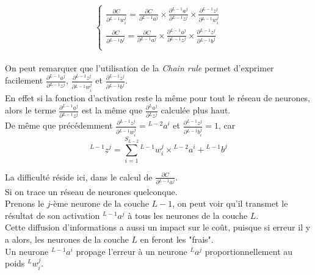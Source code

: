 \documentclass[10pt,a4paper]{report}
\newcommand{\lexp}[1]{\phantom{}^{#1}}
\newcommand{\elem}[4]{\lexp{#2}#1^{#3}_{#4}}
\begin{document}
				$$\left\{
				\begin{array}{l}
					\frac{\partial C}{\partial \elem{w}{L-1}{j}{i}} = \frac{\partial C}{\partial \elem{a}{L-1}{j}{}} \times \frac{\partial \elem{a}{L-1}{j}{}}{\partial \elem{z}{L-1}{j}{}} \times \frac{\partial \elem{z}{L-1}{j}{}}{\partial \elem{w}{L-1}{j}{i}}\\
					\frac{\partial C}{\partial \elem{b}{L-1}{j}{}} = \frac{\partial C}{\partial \elem{a}{L-1}{j}{}} \times \frac{\partial \elem{a}{L-1}{j}{}}{\partial \elem{z}{L-1}{j}{}} \times \frac{\partial \elem{z}{L-1}{j}{}}{\partial \elem{b}{L-1}{j}{}}\\
				\end{array}
				\right.$$\\
				
				On peut remarquer que l'utilisation de la \emph{Chain rule} permet d'exprimer facilement $\frac{\partial \elem{a}{L-1}{j}{}}{\partial \elem{z}{L-1}{j}{}}$, $\frac{\partial \elem{z}{L-1}{j}{}}{\partial \elem{w}{L-1}{j}{i}}$ et $\frac{\partial \elem{z}{L-1}{j}{}}{\partial \elem{b}{L-1}{j}{}}$.\\
				En effet si la fonction d'activation reste la même pour tout le réseau de neurones, alors le terme $\frac{\partial \elem{a}{L-1}{j}{}}{\partial \elem{z}{L-1}{j}{}}$ est la même que $\frac{\partial \elem{a}{L}{j}{}}{\partial \elem{z}{L}{j}{}}$ calculée plus haut.\\
				De même que précédemment $\frac{\partial \elem{z}{L-1}{j}{}}{\partial \elem{w}{L-1}{j}{i}}=\elem{a}{L-2}{i}{}$ et $\frac{\partial \elem{z}{L-1}{j}{}}{\partial \elem{b}{L-1}{j}{i}} = 1$, car
				$$\elem{z}{L-1}{j}{} = \sum_{i=1}^{S_{L-2}}{\elem{w}{L-1}{j}{i} \times \elem{a}{L-2}{i}{}} + \elem{b}{L-1}{j}{}$$
				
				La difficulté réside ici, dans le calcul de $\frac{\partial C}{\partial \elem{a}{L-1}{j}{}}$.\\
				Si on trace un réseau de neurones quelconque.\\
				Prenons le $j$-ème neurone de la couche $L-1$, on peut voir qu'il transmet le résultat de son activation $\elem{a}{L-1}{j}{}$ à tous les neurones de la couche $L$.\\
				Cette diffusion d'informations a aussi un impact sur le coût, puisque si erreur il y a alors, les neurones de la couche $L$ en feront les "frais".\\
				Un neurone $\elem{a}{L-1}{i}{}$ propage l'erreur à un neurone $\elem{a}{L}{j}{}$ proportionnellement au poids $\elem{w}{L}{j}{i}$.\\
				
\end{document}
